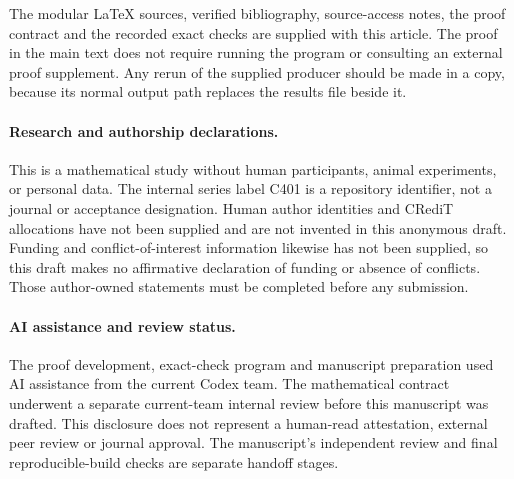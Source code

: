The modular \LaTeX{} sources, verified bibliography, source-access notes,
the proof contract and the recorded exact checks are supplied with this
article. The proof in the main text does not require running the program
or consulting an external proof supplement. Any rerun of the supplied
producer should be made in a copy, because its normal output path
replaces the results file beside it.

\paragraph{Research and authorship declarations.}
This is a mathematical study without human participants, animal
experiments, or personal data. The internal series label C401 is a
repository identifier, not a journal or acceptance designation. Human
author identities and CRediT allocations have not been supplied and
are not invented in this anonymous draft. Funding and conflict-of-interest
information likewise has not been supplied, so this draft makes no
affirmative declaration of funding or absence of conflicts. Those
author-owned statements must be completed before any submission.

\paragraph{AI assistance and review status.}
The proof development, exact-check program and manuscript preparation
used AI assistance from the current Codex team. The mathematical
contract underwent a separate current-team internal review before
this manuscript was drafted. This disclosure does not represent a
human-read attestation, external peer review or journal approval.
The manuscript's independent review and final reproducible-build
checks are separate handoff stages.

